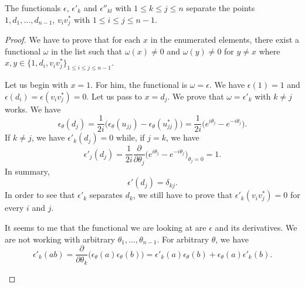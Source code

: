\begin{proposition}
	The functionals $\epsilon$, $\epsilon'_{k}$ and $\epsilon''_{kl}$ with $1\leq k\leq j\leq n$ separate the points $1,d_1,\ldots,d_{n-1}$, $v_iv_j^*$ with $1\leq i\leq j\leq n-1$.
\end{proposition}

\begin{proof}
	We have to prove that for each $x$ in the enumerated elements, there exist a functional $\omega$ in the list such that $\omega(x)\neq 0$ and $\omega(y)\neq 0$ for $y\neq x$ where $x,y\in\{ 1,d_i,v_iv_j^* \}_{1\leq i\leq j\leq n-1}$.

	Let us begin with $x=1$. For him, the functional is $\omega=\epsilon$. We have $\epsilon(1)=1$ and $\epsilon(d_i)=\epsilon(v_iv_j^*)=0$. Let us pass to $x=d_j$. We prove that $\omega=\epsilon'_k$ with $k\neq j$ works. We have
	\begin{equation}
		\epsilon_{\theta}(d_j)=\frac{1}{ 2i }\big( \epsilon_{\theta}(u_{jj})-\epsilon_{\theta}(u_{jj}^*) \big)=\frac{1}{ 2i }\big(  e^{i\theta_j}- e^{-i\theta_j} \big).
	\end{equation}
	If $k\neq j$, we have $\epsilon'_k(d_j)=0$ while, if $j=k$, we have
	\begin{equation}
		\epsilon'_j(d_j)=\frac{1}{ 2i }\frac{ \partial  }{ \partial \theta_j }\big(  e^{i\theta_j}- e^{-i\theta_j} \big)_{\theta_j=0}=1.
	\end{equation}
	In summary,
	\begin{equation}
		\epsilon'(d_j)=\delta_{kj}.
	\end{equation}
	In order to see that $\epsilon'_k$ separates $d_k$, we still have to prove that $\epsilon'_k(v_iv_j^*)=0$ for every $i$ and $j$.

	\begin{probleme}
		It seems to me that the functional we are looking at are $\epsilon$ and its derivatives. We are not working with arbitrary $\theta_1,\ldots,\theta_{n-1}$. For arbitrary $\theta$, we have
		\begin{equation}
			\epsilon'_k(ab)=\frac{ \partial  }{ \partial \theta_k }\big( \epsilon_{\theta}(a)\epsilon_{\theta}(b) \big)=\epsilon'_k(a)\epsilon_{\theta}(b)+\epsilon_{\theta}(a)\epsilon'_k(b).
		\end{equation}
	\end{probleme}
\end{proof}


